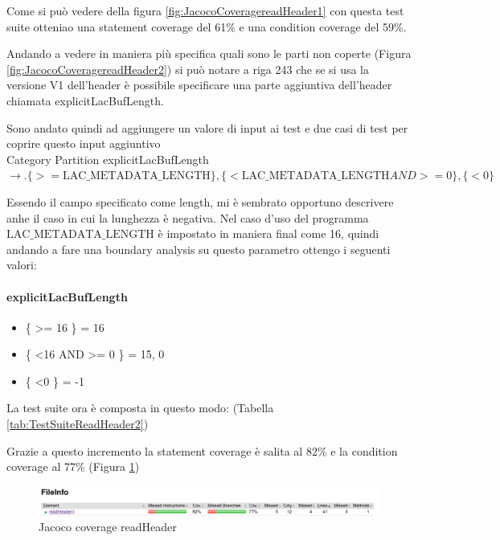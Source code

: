 \documentclass[12pt, a4paper]{article}
\begin{document}
Come si può vedere della figura \ref{fig:JacocoCoveragereadHeader1} con questa test suite otteniao
una statement coverage del 61\% e una condition coverage del 59\%.

Andando a vedere in maniera più specifica quali sono le parti non coperte (Figura \ref{fig:JacocoCoveragereadHeader2})
si può notare a riga 243 che se si usa la versione V1 dell'header è possibile specificare una parte aggiuntiva dell'header
chiamata explicitLacBufLength.

Sono andato quindi ad aggiungere un valore di input ai test e due casi di test per coprire questo input aggiuntivo \\
Category Partition explicitLacBufLength $\rightarrow.
\{ >= \text{LAC\_METADATA\_LENGTH} \},
\{ <  \text{LAC\_METADATA\_LENGTH} AND >= 0\}, 
\{ < 0 \}$ 

Essendo il campo specificato come length, mi è sembrato opportuno descrivere anhe il caso in cui la lunghezza è negativa.
Nel caso d'uso del programma $\text{LAC\_METADATA\_LENGTH}$ è impostato in maniera final come 16, quindi andando a fare una boundary
analysis su questo parametro ottengo i seguenti valori:

\paragraph{explicitLacBufLength}
\begin{itemize}
  \item \{ \textgreater= 16 \} = 16
  \item \{ \textless 16 AND \textgreater= 0 \} = 15, 0
  \item \{ \textless 0 \} = -1
\end{itemize}

La test suite ora è composta in questo modo: (Tabella \ref{tab:TestSuiteReadHeader2})

Grazie a questo incremento la statement coverage è salita al 82\%
e la condition coverage al 77\% (Figura \ref{fig:JacocoCoveragereadHeader3})

\begin{figure}
  \includegraphics[width=\linewidth]{./images/file_info/JacocoCoveragereadHeader3.png}
  \caption{Jacoco coverage readHeader}
  \label{fig:JacocoCoveragereadHeader3}
\end{figure}
\end{document}
